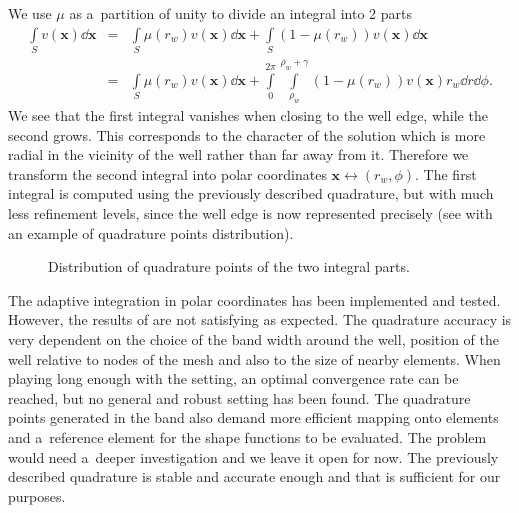 We use $\mu$ as a~partition of unity to divide an integral into 2 parts
\begin{eqnarray} 
      \int\limits_S v(\mathbf{x}) \dd \mathbf{x} &=& \int\limits_S \mu(r_w) v(\mathbf{x}) \dd \mathbf{x} + \int\limits_S (1-\mu(r_w)) v(\mathbf{x}) \dd \mathbf{x} \nonumber\\
      &=& \int\limits_S \mu(r_w) v(\mathbf{x}) \dd \mathbf{x} + \int\limits_0^{2\pi} \int\limits_{\rho_w}^{\rho_w+\gamma} (1-\mu(r_w)) v(\mathbf{x}) r_w \dd r \dd \phi.
\end{eqnarray}
We see that the first integral vanishes when closing to the well edge, while the second grows. This corresponds
to the character of the solution which is more radial in the vicinity of the well rather than far away from it.
Therefore we transform the second integral into polar coordinates $\mathbf{x} \longleftrightarrow (r_w,\phi)$. 
The first integral is computed using the previously described quadrature, but with much less refinement
levels, since the well edge is now represented precisely (see  with
an example of quadrature points distribution).
%
\begin{figure}[!htb]
  \centering    
  \hspace{0pt}
  \caption[Polar quadrature points.]
  {Distribution of quadrature points of the two integral parts.
  }
  \label{fig:polar_quad_points}
\end{figure} 

The adaptive integration in polar coordinates has been implemented and tested.
However, the results of are not satisfying as expected. The quadrature accuracy is very dependent on the choice of
the band width around the well, position of the well relative to nodes of the mesh and also to the size of nearby elements.
When playing long enough with the setting, an optimal convergence rate can be reached, but no general and robust 
setting has been found. The quadrature points generated in the band also demand more efficient mapping onto elements and a~reference element
for the shape functions to be evaluated.
The problem would need a~deeper investigation and we leave it open for now.
The previously described quadrature is stable and accurate enough and that is sufficient for our purposes. 


